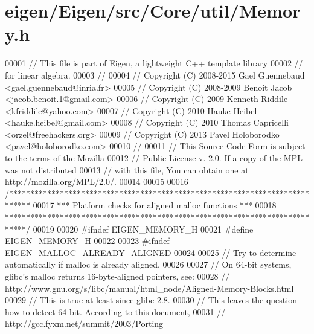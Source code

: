 \hypertarget{eigen_2_eigen_2src_2_core_2util_2_memory_8h_source}{}\section{eigen/\+Eigen/src/\+Core/util/\+Memory.h}
\label{eigen_2_eigen_2src_2_core_2util_2_memory_8h_source}

\begin{DoxyCode}
00001 \textcolor{comment}{// This file is part of Eigen, a lightweight C++ template library}
00002 \textcolor{comment}{// for linear algebra.}
00003 \textcolor{comment}{//}
00004 \textcolor{comment}{// Copyright (C) 2008-2015 Gael Guennebaud <gael.guennebaud@inria.fr>}
00005 \textcolor{comment}{// Copyright (C) 2008-2009 Benoit Jacob <jacob.benoit.1@gmail.com>}
00006 \textcolor{comment}{// Copyright (C) 2009 Kenneth Riddile <kfriddile@yahoo.com>}
00007 \textcolor{comment}{// Copyright (C) 2010 Hauke Heibel <hauke.heibel@gmail.com>}
00008 \textcolor{comment}{// Copyright (C) 2010 Thomas Capricelli <orzel@freehackers.org>}
00009 \textcolor{comment}{// Copyright (C) 2013 Pavel Holoborodko <pavel@holoborodko.com>}
00010 \textcolor{comment}{//}
00011 \textcolor{comment}{// This Source Code Form is subject to the terms of the Mozilla}
00012 \textcolor{comment}{// Public License v. 2.0. If a copy of the MPL was not distributed}
00013 \textcolor{comment}{// with this file, You can obtain one at http://mozilla.org/MPL/2.0/.}
00014 
00015 
00016 \textcolor{comment}{/*****************************************************************************}
00017 \textcolor{comment}{*** Platform checks for aligned malloc functions                           ***}
00018 \textcolor{comment}{*****************************************************************************/}
00019 
00020 \textcolor{preprocessor}{#ifndef EIGEN\_MEMORY\_H}
00021 \textcolor{preprocessor}{#define EIGEN\_MEMORY\_H}
00022 
00023 \textcolor{preprocessor}{#ifndef EIGEN\_MALLOC\_ALREADY\_ALIGNED}
00024 
00025 \textcolor{comment}{// Try to determine automatically if malloc is already aligned.}
00026 
00027 \textcolor{comment}{// On 64-bit systems, glibc's malloc returns 16-byte-aligned pointers, see:}
00028 \textcolor{comment}{//   http://www.gnu.org/s/libc/manual/html\_node/Aligned-Memory-Blocks.html}
00029 \textcolor{comment}{// This is true at least since glibc 2.8.}
00030 \textcolor{comment}{// This leaves the question how to detect 64-bit. According to this document,}
00031 \textcolor{comment}{//   http://gcc.fyxm.net/summit/2003/Porting%
}
\end{DoxyCode}
